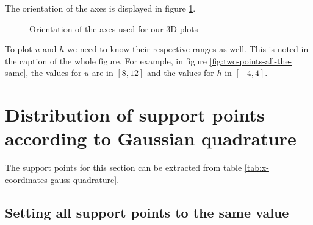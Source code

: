 \documentclass{article}
\begin{document}

The orientation of the axes is displayed in figure \ref{fig:orientation-of-axes}.

\begin{figure}[th]
  \centering
  \caption{Orientation of the axes used for our 3D plots}
  \label{fig:orientation-of-axes}
\end{figure}

To plot $u$ and $h$ we need to know their respective ranges as well. This is noted in the caption of the whole figure. For example, in figure \ref{fig:two-points-all-the-same}, the values for $u$ are in $[8, 12]$ and the values for $h$ in $[-4,4]$.


\section{Distribution of support points according to Gaussian quadrature}
\label{sec:results}

The support points for this section can be extracted from table \ref{tab:x-coordinates-gauss-quadrature}.

\subsection{Setting all support points to the same value}
\label{sec:setting-all-support-points-to-the-same-value}
\end{document}
